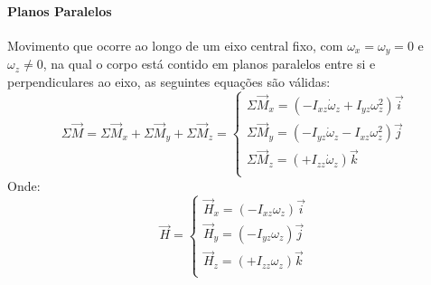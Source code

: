 \documentclass{article}
\begin{document}
            \paragraph{Planos Paralelos}Movimento que ocorre ao longo de um eixo central fixo, com $\omega_{x} = \omega_{y} = 0$ e $\omega_{z} \ne 0$, na qual o corpo está contido em planos paralelos entre si e perpendiculares ao eixo, as seguintes equações são válidas:
                \begin{equation}
                    \boxed{
                        \Sigma\vec{M} = 
                        \Sigma\vec{M}_{x} + 
                        \Sigma\vec{M}_{y} + 
                        \Sigma\vec{M}_{z} = 
                        \begin{cases}
                            \Sigma\vec{M}_{x} = (- I_{xz}\dot{\omega}_{z} + I_{yz}\omega_{z}^{2})\vec{i}\\
                            \Sigma\vec{M}_{y} = (- I_{yz}\dot{\omega}_{z} - I_{xz}\omega_{z}^{2})\vec{j}\\
                            \Sigma\vec{M}_{z} = (+ I_{zz}\dot{\omega}_{z})\vec{k}\\
                        \end{cases}
                    }
                \end{equation}
            Onde:
                \begin{equation}
                    \boxed{
                        \vec{H} = 
                        \begin{cases}
                            \vec{H}_{x} = (- I_{xz}\omega_{z})\vec{i}\\
                            \vec{H}_{y} = (- I_{yz}\omega_{z})\vec{j}\\
                            \vec{H}_{z} = (+ I_{zz}\omega_{z})\vec{k}\\
                        \end{cases}
                    }
                \end{equation}
\end{document}

